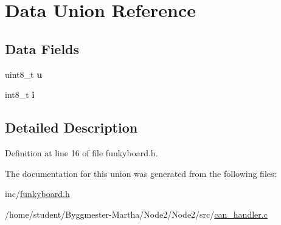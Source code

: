 \hypertarget{unionData}{}\section{Data Union Reference}
\label{unionData}
\subsection*{Data Fields}
\begin{DoxyCompactItemize}
\item 
\mbox{\label{unionData_a6d913633423729c5773303b505873597}} 
uint8\+\_\+t {\bfseries u}
\item 
\mbox{\label{unionData_a611d229e5820bb45c641d1e27be9eaa7}} 
int8\+\_\+t {\bfseries i}
\end{DoxyCompactItemize}


\subsection{Detailed Description}


Definition at line 16 of file funkyboard.\+h.



The documentation for this union was generated from the following files\+:\begin{DoxyCompactItemize}
\item 
inc/\hyperlink{funkyboard_8h}{funkyboard.\+h}\item 
/home/student/\+Byggmester-\/\+Martha/\+Node2/\+Node2/src/\hyperlink{can__handler_8c}{can\+\_\+handler.\+c}\end{DoxyCompactItemize}
